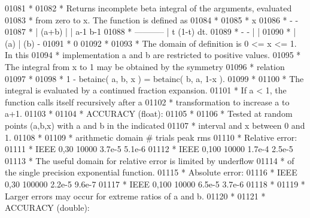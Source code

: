 \begin{DoxyCode}
01081 \textcolor{comment}{     *}
01082 \textcolor{comment}{     * Returns incomplete beta integral of the arguments, evaluated}
01083 \textcolor{comment}{     * from zero to x.  The function is defined as}
01084 \textcolor{comment}{     *}
01085 \textcolor{comment}{     *                  x}
01086 \textcolor{comment}{     *     -            -}
01087 \textcolor{comment}{     *    | (a+b)      | |  a-1     b-1}
01088 \textcolor{comment}{     *  -----------    |   t   (1-t)   dt.}
01089 \textcolor{comment}{     *   -     -     | |}
01090 \textcolor{comment}{     *  | (a) | (b)   -}
01091 \textcolor{comment}{     *                 0}
01092 \textcolor{comment}{     *}
01093 \textcolor{comment}{     * The domain of definition is 0 <= x <= 1.  In this}
01094 \textcolor{comment}{     * implementation a and b are restricted to positive values.}
01095 \textcolor{comment}{     * The integral from x to 1 may be obtained by the symmetry}
01096 \textcolor{comment}{     * relation}
01097 \textcolor{comment}{     *}
01098 \textcolor{comment}{     *    1 - betainc( a, b, x )  =  betainc( b, a, 1-x ).}
01099 \textcolor{comment}{     *}
01100 \textcolor{comment}{     * The integral is evaluated by a continued fraction expansion.}
01101 \textcolor{comment}{     * If a < 1, the function calls itself recursively after a}
01102 \textcolor{comment}{     * transformation to increase a to a+1.}
01103 \textcolor{comment}{     *}
01104 \textcolor{comment}{     * ACCURACY (float):}
01105 \textcolor{comment}{     *}
01106 \textcolor{comment}{     * Tested at random points (a,b,x) with a and b in the indicated}
01107 \textcolor{comment}{     * interval and x between 0 and 1.}
01108 \textcolor{comment}{     *}
01109 \textcolor{comment}{     * arithmetic   domain     # trials      peak         rms}
01110 \textcolor{comment}{     * Relative error:}
01111 \textcolor{comment}{     *    IEEE       0,30       10000       3.7e-5      5.1e-6}
01112 \textcolor{comment}{     *    IEEE       0,100      10000       1.7e-4      2.5e-5}
01113 \textcolor{comment}{     * The useful domain for relative error is limited by underflow}
01114 \textcolor{comment}{     * of the single precision exponential function.}
01115 \textcolor{comment}{     * Absolute error:}
01116 \textcolor{comment}{     *    IEEE       0,30      100000       2.2e-5      9.6e-7}
01117 \textcolor{comment}{     *    IEEE       0,100      10000       6.5e-5      3.7e-6}
01118 \textcolor{comment}{     *}
01119 \textcolor{comment}{     * Larger errors may occur for extreme ratios of a and b.}
01120 \textcolor{comment}{     *}
01121 \textcolor{comment}{     * ACCURACY (double):}

\end{DoxyCode}
